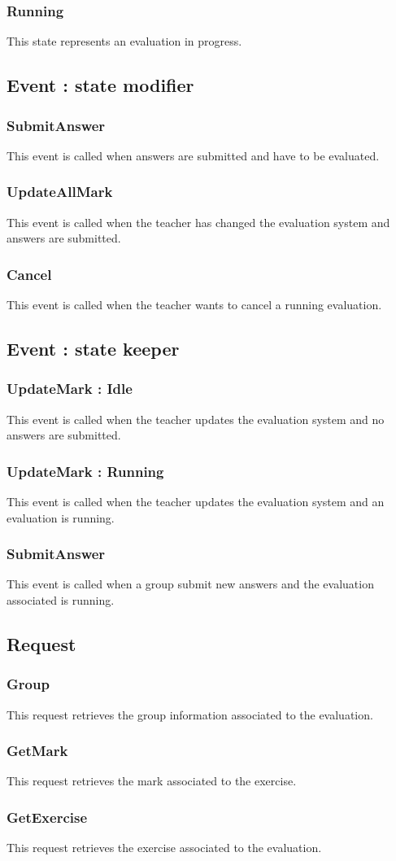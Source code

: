 		\subsubsection{Running}
			This state represents an evaluation in progress.
	\subsection{Event : state modifier}
		\subsubsection{SubmitAnswer}
			This event is called when answers are submitted and have to be evaluated.
		\subsubsection{UpdateAllMark}
			This event is called when the teacher has changed the evaluation system and answers are submitted.
		\subsubsection{Cancel}
			This event is called when the teacher wants to cancel a running evaluation.
	\subsection{Event : state keeper}
		\subsubsection{UpdateMark : Idle}
			This event is called when the teacher updates the evaluation system and no answers are submitted.
		\subsubsection{UpdateMark : Running}
			This event is called when the teacher updates the evaluation system and an evaluation is running.
		\subsubsection{SubmitAnswer}
			This event is called when a group submit new answers and the evaluation associated is running.
	\subsection{Request}
		\subsubsection{Group}
			This request retrieves the group information associated to the evaluation.
		\subsubsection{GetMark}
			This request retrieves the mark associated to the exercise.
		\subsubsection{GetExercise}
			This request retrieves the exercise associated to the evaluation.
			
			
	
			


